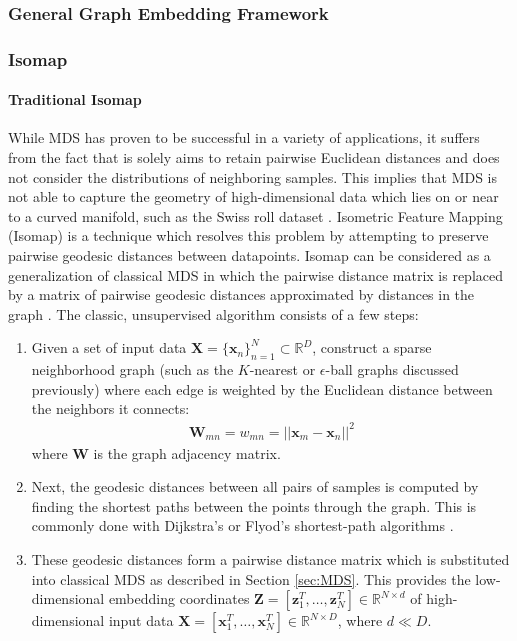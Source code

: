 \subsubsection{General Graph Embedding Framework}

\subsubsection{Isomap}
\paragraph{Traditional Isomap}
While MDS has proven to be successful in a variety of applications, it suffers from the fact that is solely aims to retain pairwise Euclidean distances and does not consider the distributions of neighboring samples.  This implies that MDS is not able to capture the geometry of high-dimensional data which lies on or near to a curved manifold, such as the Swiss roll dataset \citep{VanDerMaaten2009DRReview,Chao2019RecentAdvancesSupervisedDimRed}. Isometric Feature Mapping (Isomap) \citep{Tenenbaum2000Isomap} is a technique which resolves this problem by attempting to preserve pairwise geodesic distances between datapoints.  Isomap can be considered as a generalization of classical MDS in which the pairwise distance matrix is replaced by a matrix of pairwise geodesic distances approximated by distances in the graph \citep{Thorstensen2009ManifoldThesis}.  The classic, unsupervised algorithm consists of a few steps:

\begin{enumerate}
\item Given a set of input data $\bm{X} = \{\bm{x}_{n}\}^{N}_{n=1} \subset \mathbb{R}^{D}$, construct a sparse neighborhood graph (such as the $K$-nearest  or $\epsilon$-ball graphs discussed previously) where each edge is weighted by the Euclidean distance between the neighbors it connects:
\begin{align}
	\bm{W}_{mn} = w_{mn} = ||\bm{x}_{m} - \bm{x}_{n} ||^{2} 
\end{align}
where $\bm{W}$ is the graph adjacency matrix.  

\item Next, the geodesic distances between all pairs of samples is computed by finding the shortest paths between the points through the graph.  This is commonly done with Dijkstra's or Flyod's shortest-path algorithms \citep{Tenenbaum2000Isomap}.  

\item These geodesic distances form a pairwise distance matrix which is substituted into classical MDS as described in Section \ref{sec:MDS}.  This provides the low-dimensional embedding coordinates $\bm{Z} = [\bm{z}^{T}_{1}, \dots, \bm{z}^{T}_{N}] \in \mathbb{R}^{N \times d}$ of high-dimensional input data  $\bm{X} = [\bm{x}^{T}_{1}, \dots, \bm{x}^{T}_{N}] \in \mathbb{R}^{N \times D}$, where $d \ll D$.

\end{enumerate}

